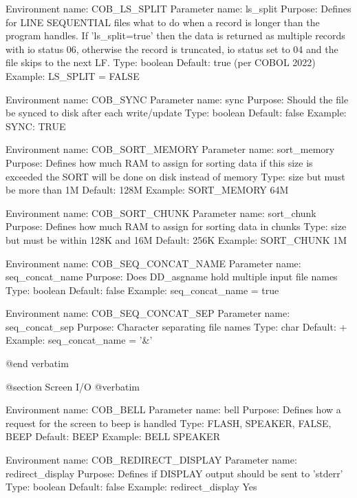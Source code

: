 Environment name:  COB_LS_SPLIT
  Parameter name:  ls_split
         Purpose:  Defines for LINE SEQUENTIAL files what to do when a record
                   is longer than the program handles. If 'ls_split=true' then
                   the data is returned as multiple records with io status 06,
                   otherwise the record is truncated, io status set to 04 and
                   the file skips to the next LF.
            Type:  boolean
         Default:  true (per COBOL 2022)
         Example:  LS_SPLIT = FALSE

Environment name:  COB_SYNC
  Parameter name:  sync
         Purpose:  Should the file be synced to disk after each write/update
            Type:  boolean
         Default:  false
         Example:  SYNC: TRUE

Environment name:  COB_SORT_MEMORY
  Parameter name:  sort_memory
         Purpose:  Defines how much RAM to assign for sorting data
                   if this size is exceeded the  SORT  will be done
                   on disk instead of memory
            Type:  size  but must be more than 1M
         Default:  128M
         Example:  SORT_MEMORY 64M

Environment name:  COB_SORT_CHUNK
  Parameter name:  sort_chunk
         Purpose:  Defines how much RAM to assign for sorting data in chunks
            Type:  size  but must be within 128K and 16M
         Default:  256K
         Example:  SORT_CHUNK 1M

Environment name:  COB_SEQ_CONCAT_NAME
  Parameter name:  seq_concat_name
         Purpose:  Does DD_asgname hold multiple input file names
            Type:  boolean
         Default:  false
         Example:  seq_concat_name = true

Environment name:  COB_SEQ_CONCAT_SEP
  Parameter name:  seq_concat_sep
         Purpose:  Character separating file names
            Type:  char
         Default:  +
         Example:  seq_concat_name = '&'


@end verbatim

@section Screen I/O
@verbatim


Environment name:  COB_BELL
  Parameter name:  bell
         Purpose:  Defines how a request for the screen to beep is handled
            Type:  FLASH, SPEAKER, FALSE, BEEP
         Default:  BEEP
         Example:  BELL SPEAKER

Environment name:  COB_REDIRECT_DISPLAY
  Parameter name:  redirect_display
         Purpose:  Defines if DISPLAY output should be sent to 'stderr'
            Type:  boolean
         Default:  false
         Example:  redirect_display Yes

